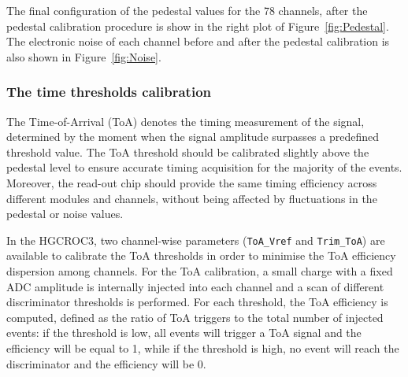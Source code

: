 \bigbreak

The final configuration of the pedestal values for the 78 channels, after the pedestal calibration procedure is show in the right plot of Figure~\ref{fig:Pedestal}. The electronic noise of each channel before and after the pedestal calibration is also shown in Figure~\ref{fig:Noise}.


\subsubsection{The time thresholds calibration}
\label{subsubsec:The time thresholds calibration}

The Time-of-Arrival (ToA) denotes the timing measurement of the signal, determined by the moment when the signal amplitude surpasses a predefined threshold value. The ToA threshold should be calibrated slightly above the pedestal level to ensure accurate timing acquisition for the majority of the events. Moreover, the read-out chip should provide the same timing efficiency across different modules and channels, without being affected by fluctuations in the pedestal or noise values.

\bigbreak

In the HGCROC3, two channel-wise parameters (\texttt{ToA\_Vref} and \texttt{Trim\_ToA}) are available to calibrate the ToA thresholds in order to minimise the ToA efficiency dispersion among channels.
For the ToA calibration, a small charge with a fixed ADC amplitude is internally injected into each channel and a scan of different discriminator thresholds is performed. For each threshold, the ToA efficiency is computed, defined as the ratio of ToA triggers to the total number of injected events: if the threshold is low, all events will trigger a ToA signal and the efficiency will be equal to 1, while if the threshold is high, no event will reach the discriminator and the efficiency will be 0.

